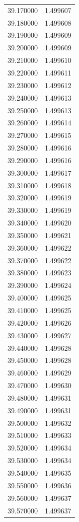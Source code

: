 \begin{tabular}{rr}
39.170000 & 1.499607 \\
39.180000 & 1.499608 \\
39.190000 & 1.499609 \\
39.200000 & 1.499609 \\
39.210000 & 1.499610 \\
39.220000 & 1.499611 \\
39.230000 & 1.499612 \\
39.240000 & 1.499613 \\
39.250000 & 1.499613 \\
39.260000 & 1.499614 \\
39.270000 & 1.499615 \\
39.280000 & 1.499616 \\
39.290000 & 1.499616 \\
39.300000 & 1.499617 \\
39.310000 & 1.499618 \\
39.320000 & 1.499619 \\
39.330000 & 1.499619 \\
39.340000 & 1.499620 \\
39.350000 & 1.499621 \\
39.360000 & 1.499622 \\
39.370000 & 1.499622 \\
39.380000 & 1.499623 \\
39.390000 & 1.499624 \\
39.400000 & 1.499625 \\
39.410000 & 1.499625 \\
39.420000 & 1.499626 \\
39.430000 & 1.499627 \\
39.440000 & 1.499628 \\
39.450000 & 1.499628 \\
39.460000 & 1.499629 \\
39.470000 & 1.499630 \\
39.480000 & 1.499631 \\
39.490000 & 1.499631 \\
39.500000 & 1.499632 \\
39.510000 & 1.499633 \\
39.520000 & 1.499634 \\
39.530000 & 1.499634 \\
39.540000 & 1.499635 \\
39.550000 & 1.499636 \\
39.560000 & 1.499637 \\
39.570000 & 1.499637 \\

\end{tabular}
